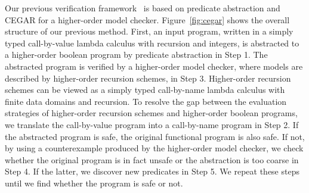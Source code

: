 Our previous verification framework~\cite{KobayashiPLDI2011} is based on
predicate abstraction and CEGAR for a higher-order model checker.
Figure~\ref{fig:cegar} shows the overall structure of our previous
method.  First, an input program, written in a simply typed
call-by-value lambda calculus with recursion and integers, is abstracted
to a higher-order boolean program by predicate abstraction in Step 1.
The abstracted program is verified by a higher-order model checker,
where models are described by higher-order recursion schemes, in Step 3.
Higher-order recursion schemes can be viewed as a simply typed
call-by-name lambda calculus with finite data domains and recursion.  To
resolve the gap between the evaluation strategies of higher-order
recursion schemes and higher-order boolean programs, we translate the
call-by-value program into a call-by-name program in Step 2. If the
abstracted program is safe, the original functional program is also
safe.  If not, by using a counterexample produced by the higher-order
model checker, we check whether the original program is in fact unsafe
or the abstraction is too coarse in Step 4. If the latter, we discover
new predicates in Step 5.  We repeat these steps until we find whether
the program is safe or not.

